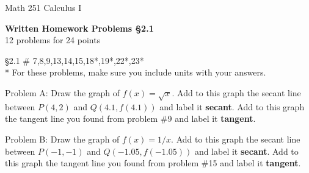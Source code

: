 \documentclass[11pt]{report}
\theoremstyle{plain}
\begin{document}
\hfill Math 251 Calculus I
\begin{center}
\Large{\textbf{Written Homework Problems \S 2.1}} \\
12 problems for 24 points\\
\end{center}
\begin{description}
\item{\S 2.1} \# 7,8,9,13,14,15,18*,19*,22*,23* \\

* For these problems, make sure you include units with your answers.\\

\item Problem A: Draw the graph of $f(x)=\sqrt{x}.$ Add to this graph the secant line between $P(4,2)$ and $Q(4.1, f(4.1))$ and label it \textbf{secant}. Add to this graph the tangent line you found from problem \#9 and label it \textbf{tangent}.

\item Problem B: Draw the graph of $f(x)=1/x.$ Add to this graph the secant line between $P(-1,-1)$ and $Q(-1.05, f(-1.05))$ and label it \textbf{secant}. Add to this graph the tangent line you found from problem \#15 and label it \textbf{tangent}.

\end{description}
\end{document}
